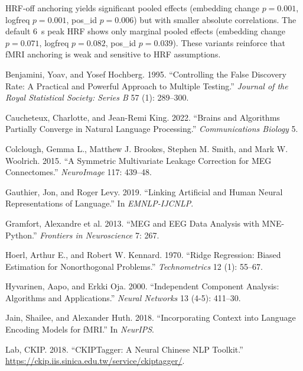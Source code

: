 \documentclass[
]{article}
\newlength{\cslhangindent}
\newenvironment{CSLReferences}[2] %
 {\begin{list}{}{%
  \setlength{\itemindent}{0pt}
  \setlength{\leftmargin}{0pt}
  \setlength{\parsep}{0pt}
  \ifodd #1
   \setlength{\leftmargin}{\cslhangindent}
   \setlength{\itemindent}{-1\cslhangindent}
  \fi
  \setlength{\itemsep}{#2\baselineskip}}}
 {\end{list}}
\begin{document}
HRF-off anchoring yields significant pooled effects (embedding change
\(p=0.001\), logfreq \(p=0.001\), pos\_id \(p=0.006\)) but with smaller
absolute correlations. The default 6~s peak HRF shows only marginal
pooled effects (embedding change \(p=0.071\), logfreq \(p=0.082\),
pos\_id \(p=0.039\)). These variants reinforce that fMRI anchoring is
weak and sensitive to HRF assumptions.

\protect{}\label{refs}
\begin{CSLReferences}{1}{0}
Benjamini, Yoav, and Yosef Hochberg. 1995. {``Controlling the False
Discovery Rate: A Practical and Powerful Approach to Multiple
Testing.''} \emph{Journal of the Royal Statistical Society: Series B} 57
(1): 289--300.

Caucheteux, Charlotte, and Jean-Remi King. 2022. {``Brains and
Algorithms Partially Converge in Natural Language Processing.''}
\emph{Communications Biology} 5.

Colclough, Gemma L., Matthew J. Brookes, Stephen M. Smith, and Mark W.
Woolrich. 2015. {``A Symmetric Multivariate Leakage Correction for MEG
Connectomes.''} \emph{NeuroImage} 117: 439--48.

Gauthier, Jon, and Roger Levy. 2019. {``Linking Artificial and Human
Neural Representations of Language.''} In \emph{EMNLP-IJCNLP}.

Gramfort, Alexandre et al. 2013. {``MEG and EEG Data Analysis with
MNE-Python.''} \emph{Frontiers in Neuroscience} 7: 267.

Hoerl, Arthur E., and Robert W. Kennard. 1970. {``Ridge Regression:
Biased Estimation for Nonorthogonal Problems.''} \emph{Technometrics} 12
(1): 55--67.

Hyvarinen, Aapo, and Erkki Oja. 2000. {``Independent Component Analysis:
Algorithms and Applications.''} \emph{Neural Networks} 13 (4-5):
411--30.

Jain, Shailee, and Alexander Huth. 2018. {``Incorporating Context into
Language Encoding Models for fMRI.''} In \emph{NeurIPS}.

Lab, CKIP. 2018. {``CKIPTagger: A Neural Chinese NLP Toolkit.''}
\url{https://ckip.iis.sinica.edu.tw/service/ckiptagger/}.


\end{CSLReferences}
\end{document}
